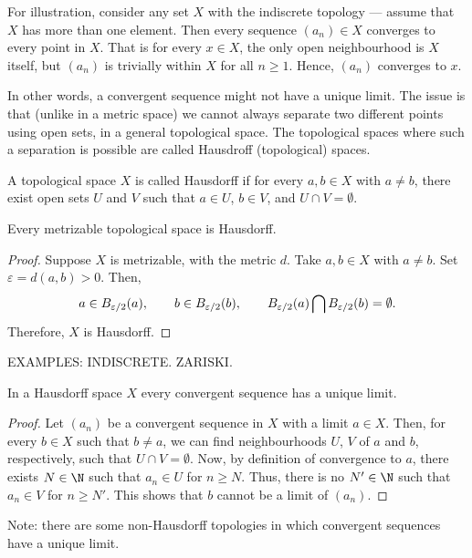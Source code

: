 For illustration, consider any set $X$ with the indiscrete topology --- assume that $X$ has more than one element. Then every sequence $(a_n) \in X$ converges to every point in $X$. That is for every $x \in X$, the only open neighbourhood is $X$ itself, but $(a_n)$ is trivially within $X$ for all $n \geq 1$. Hence, $(a_n)$ converges to $x$.

In other words, a convergent sequence might not have a unique limit. The issue is that (unlike in a metric space) we cannot always separate two different points using open sets, in a general topological space. The topological spaces where such a separation is possible are called Hausdroff (topological) spaces.
\begin{ndfn}
  A topological space $X$ is called Hausdorff if for every $a, b \in X$ with $a \neq b$, there exist open sets $U$ and $V$ such that $a \in U$, $b \in V$, and $U \cap V = \emptyset$.
\end{ndfn}

\begin{nlemma}
  Every metrizable topological space is Hausdorff.
\end{nlemma}
\begin{proof}
  Suppose $X$ is metrizable, with the metric $d$. Take $a, b \in X$ with $a \neq b$. Set $\varepsilon = d(a,b) > 0$. Then,
  \begin{equation*}
    a \in B_{\varepsilon/2}(a),
    \qquad
    b \in B_{\varepsilon/2}(b),
    \qquad
    B_{\varepsilon/2}(a) \bigcap B_{\varepsilon/2}(b) = \emptyset.
  \end{equation*}
  Therefore, $X$ is Hausdorff.
\end{proof}

EXAMPLES: INDISCRETE. ZARISKI.

\begin{nlemma}
  In a Hausdorff space $X$ every convergent sequence has a unique limit.
\end{nlemma}
\begin{proof}
  Let $(a_n)$ be a convergent sequence in $X$ with a limit $a \in X$. Then, for every $b \in X$ such that $b \neq a$, we can find neighbourhoods $U$, $V$ of $a$ and $b$, respectively, such that $U \cap V = \emptyset$. Now, by definition of convergence to $a$, there exists $N \in \N$ such that $a_n \in U$ for $n \geq N$. Thus, there is no $N' \in \N$ such that $a_n \in V$ for $n \geq N'$. This shows that $b$ cannot be a limit of $(a_n)$.
\end{proof}
Note: there are some non-Hausdorff topologies in which convergent sequences have a unique limit.

